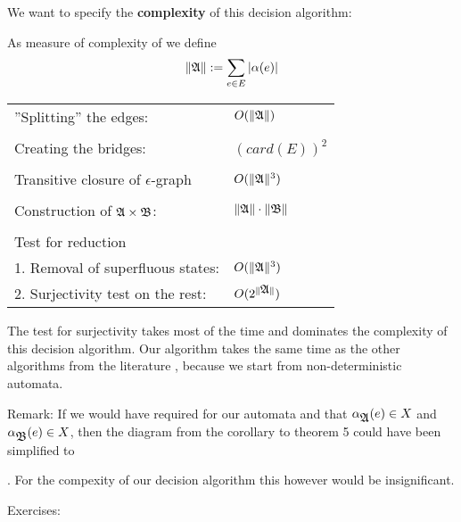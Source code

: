 We want to specify the {\bf complexity} of this decision algorithm:

As measure of complexity of  we define 
\[ \|\mbox{$\mathfrak{A}$}\| := \sum_{e \in E} |\alpha(e)| \]

\begin{tabular}{ll}
  ''Splitting'' the edges: & $O(\|\mbox{$\mathfrak{A}$}\|)$ \\  \\
  Creating the bridges: & $(card(E))^2$ \\ \\
  Transitive closure of $\epsilon$-graph & $O(\|\mbox{$\mathfrak{A}$}\|^3)$ \\  \\
  Construction of $\mbox{$\mathfrak{A}$} \times \mbox{$\mathfrak{B}$}$: & $\|\mbox{$\mathfrak{A}$}\| \cdot \|\mbox{$\mathfrak{B}$}\|$ \\ \\
  Test for reduction \\
  1. Removal of superfluous states: & $O(\|\mbox{$\mathfrak{A}$}\|^3)$ \\
  2. Surjectivity test on the rest: & $O(2^{\|\mbox{$\mathfrak{A}$}\|})$
\end{tabular}

The test for surjectivity takes most of the time and dominates the complexity of
this decision algorithm. Our algorithm takes the same time as the other
algorithms from the literature \cite{AHU}, because we start from
non-deterministic automata.

Remark: If we would have required for our automata  and  that
$\alpha_{\mbox{$\mathfrak{A}$}}(e) \in X$ and $\alpha_{\mbox{$\mathfrak{B}$}}(e) \in X$, then the diagram from
the corollary to theorem 5 could have been simplified to . For the compexity of
our decision algorithm this however would be insignificant.

Exercises:

